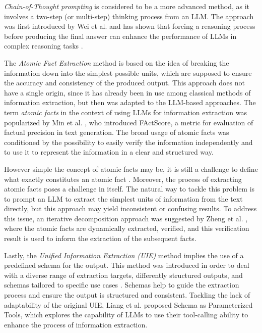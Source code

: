 \textit{Chain-of-Thought prompting} is considered to be a more advanced method, as it involves a two-step (or multi-step) thinking process from an LLM. The approach was first introduced by Wei et al. \cite{weiChainofThoughtPromptingElicits2022} and has shown that forcing a reasoning process before producing the final answer can enhance the performance of LLMs in complex reasoning tasks \cite{maChainThoughtExplicit2023}.

The \textit{Atomic Fact Extraction} method is based on the idea of breaking the information down into the simplest possible units, which are supposed to ensure the accuracy and consistency of the produced output. This approach does not have a single origin, since it has already been in use among classical methods of information extraction, but then was adapted to the LLM-based approaches. 
The term \textit{atomic facts} in the context of using LLMs for information extraction was popularized by Min et al. \cite{minFActScoreFinegrainedAtomic2023}, who introduced FActScore, a metric for evaluation of factual precision in text generation. The broad usage of atomic facts was conditioned by the possibility to easily verify the information independently and to use it to represent the information in a clear and structured way. 

However simple the concept of atomic facts may be, it is still a challenge to define what exactly constitutes an atomic fact \cite{schmidtDissectingAtomicFacts2025}. Moreover, the process of extracting atomic facts poses a challenge in itself. The natural way to tackle this problem is to prompt an LLM to extract the simplest units of information from the text directly, but this approach may yield inconsistent or confusing results. 
To address this issue, an iterative decomposition approach was suggested by Zheng et al. \cite{zhengFactFragmentsDeconstructing2025}, where the atomic facts are dynamically extracted, verified, and this verification result is used to inform the extraction of the subsequent facts.

Lastly, the \textit{Unified Information Extraction (UIE)} method implies the use of a predefined schema for the output. This method was introduced in order to deal with a diverse range of extraction targets, differently structured outputs, and schemas tailored to specific use cases \cite{luUnifiedStructureGeneration2022}. Schemas help to guide the extraction process and ensure the output is structured and consistent. Tackling the lack of adaptability of the original UIE, Liang et al. \cite{liangSchemaParameterizedTools2025} proposed Schema as Parameterized Tools, which explores the capability of LLMs to use their tool-calling ability to enhance the process of information extraction. 

